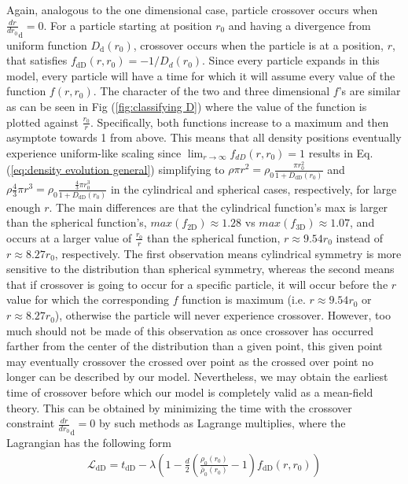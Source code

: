 \documentclass[aps,prl,twocolumn,showpacs,superscriptaddress,groupedaddress]{revtex4-1}  %
\begin{document}
{Again, analogous to the one dimensional case, particle crossover occurs when $\frac{d r}{d r_0}_\text{d} = 0$.  
For a particle starting at position $r_0$ and having a divergence from uniform function $D_\text{d}(r_0)$, crossover occurs when the particle is at 
a position, $r$, that satisfies $f_\text{dD}(r,r_0) = -1/D_d(r_0)$.  Since every particle expands in this model, every particle will have a time for which it will assume every value of the function $f(r,r_0)$.  The character of the two and three dimensional $f$'s are similar as can be seen in Fig (\ref{fig:classifying D}) where
the value of the function is plotted against $\frac{r_0}{r}$.
Specifically, both functions increase to a maximum and then asymptote towards 1 from above.  
This means that all density positions eventually experience uniform-like scaling since $\lim_{r \to \infty} f_{dD}(r,r_0) = 1$
 results in Eq. (\ref{eq:density evolution general}) simplifying to $\rho \pi r^2 =  \rho_0 \frac{\pi r_0^2}{1 + D_\text{dD}(r_0)}$ and 
$\rho \frac{4}{3} \pi r^3=  \rho_0 \frac{\frac{4}{3} \pi r_0^3}{1 + D_\text{dD}(r_0)}$ in the cylindrical and spherical cases, respectively, for large enough $r$.
The main differences are that the cylindrical function's max is larger than the spherical function's,  $max(f_\text{2D}) \approx 1.28$ 
vs $max(f_\text{3D}) \approx 1.07$, and occurs at a larger
value of $\frac{r_0}{r}$ than the spherical function, $r \approx 9.54 r_0$ instead of $r \approx 8.27 r_0$, respectively.  The first observation means cylindrical 
symmetry is more sensitive to the distribution than spherical symmetry, whereas the second means that if crossover is going to occur for a specific particle, 
it will occur before the $r$ value for which the corresponding $f$ function is maximum (i.e. $r \approx 9.54 r_0$ or $r \approx 8.27 r_0$), 
otherwise the particle will never experience crossover.    
However, too much should not be made of this observation as once crossover has occurred 
 farther from the center of the distribution than a given point, this given point may eventually crossover the crossed over point as the crossed over point no longer can be described by 
 our model.  Nevertheless, we may obtain the earliest time of crossover before which our model is completely valid as a mean-field theory.  This can be obtained by minimizing
 the time with the crossover constraint $ {\frac{dr}{dr_0}}_\text{d} = 0$ by such methods as Lagrange multiplies, where the Lagrangian has the following form
 \begin{align}
   \mathcal{L}_\text{dD} = t_\text{dD} - \lambda\left(1 - \frac{d}{2}\left(\frac{\rho_0(r_0)}{\bar{\rho}_0(r_0)} - 1\right) f_\text{dD}(r,r_0)\right)\label{eq:Lagrangian crossover}
 \end{align}

}
\end{document}
